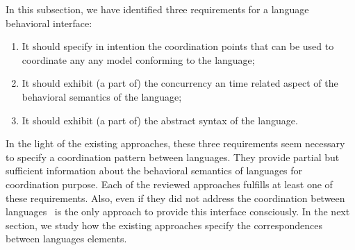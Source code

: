 {In this subsection, we have identified three requirements for a language behavioral interface:
\begin{enumerate}
\item It should specify in intention the coordination points that can be used to coordinate any  any model conforming to the language;
\item It should exhibit (a part of) the concurrency an time related aspect of the behavioral semantics of the language;
\item It should exhibit (a part of) the abstract syntax of the language.
\end{enumerate}

In the light of the existing approaches, these three requirements seem necessary to specify a coordination pattern between languages. They provide partial but sufficient information about the behavioral semantics of languages for coordination purpose. Each of the reviewed approaches fulfills at least one of these requirements. Also, even if they did not address the coordination between languages~\cite{sle13-combemale} is the only approach to provide this interface consciously. In the next section, we study how the existing approaches specify the correspondences between languages elements.	

	    	
	    	
	    				
	    				
	    				
	    				
}
